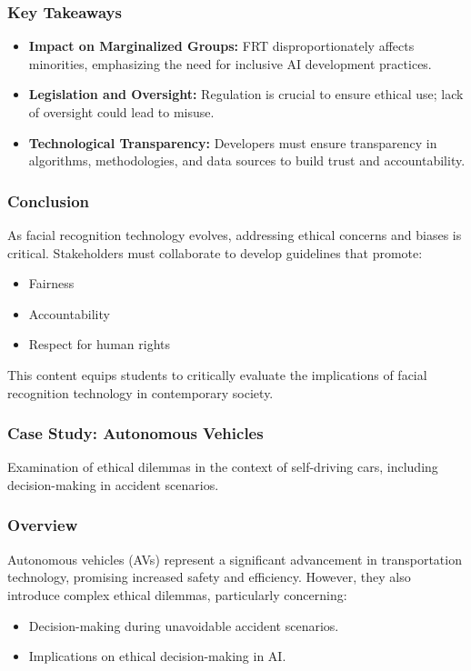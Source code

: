 \documentclass[aspectratio=169]{beamer}
\begin{document}
\begin{frame}[fragile]
    \frametitle{Key Takeaways}
    \begin{itemize}
        \item \textbf{Impact on Marginalized Groups:} FRT disproportionately affects minorities, emphasizing the need for inclusive AI development practices.
        \item \textbf{Legislation and Oversight:} Regulation is crucial to ensure ethical use; lack of oversight could lead to misuse.
        \item \textbf{Technological Transparency:} Developers must ensure transparency in algorithms, methodologies, and data sources to build trust and accountability.
    \end{itemize}
\end{frame}

\begin{frame}[fragile]
    \frametitle{Conclusion}
    As facial recognition technology evolves, addressing ethical concerns and biases is critical. Stakeholders must collaborate to develop guidelines that promote:
    \begin{itemize}
        \item Fairness
        \item Accountability
        \item Respect for human rights
    \end{itemize}
    This content equips students to critically evaluate the implications of facial recognition technology in contemporary society.
\end{frame}

\begin{frame}[fragile]
    \frametitle{Case Study: Autonomous Vehicles}
    Examination of ethical dilemmas in the context of self-driving cars, including decision-making in accident scenarios.
\end{frame}

\begin{frame}[fragile]
    \frametitle{Overview}
    Autonomous vehicles (AVs) represent a significant advancement in transportation technology, promising increased safety and efficiency. However, they also introduce complex ethical dilemmas, particularly concerning:
    \begin{itemize}
        \item Decision-making during unavoidable accident scenarios.
        \item Implications on ethical decision-making in AI.
    \end{itemize}
\end{frame}
\end{document}

